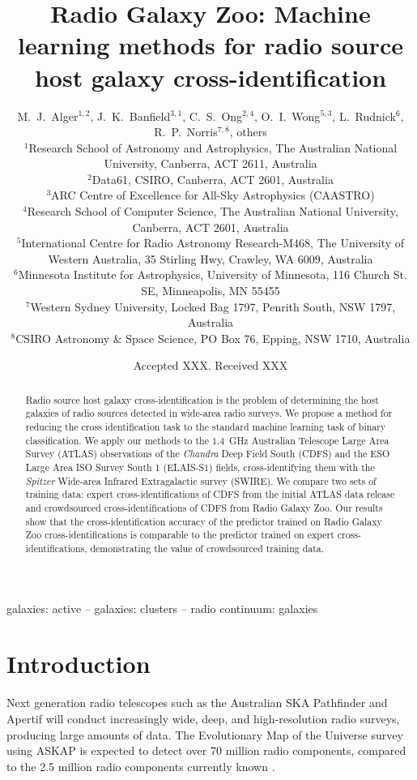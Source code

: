 \documentclass[fleqn,usenatbib,usedcolumn]{mnras}
\title[Machine learning methods for radio source cross-identification]{Radio Galaxy Zoo: Machine learning methods for radio source host galaxy cross-identification}
\author[Alger et al.]{
  M.~J.~Alger$^{1, 2}$,
  J.~K.~Banfield$^{3, 1}$,
  C.~S.~Ong$^{2, 4}$,
  O.~I.~Wong$^{5, 3}$,
  L.~Rudnick$^{6}$,
  R.~P.~Norris$^{7, 8}$,
  others
\\
$^{1}$Research School of Astronomy and Astrophysics, The Australian National University, Canberra, ACT 2611, Australia\\
$^{2}$Data61, CSIRO, Canberra, ACT 2601, Australia\\
$^{3}$ARC Centre of Excellence for All-Sky Astrophysics (CAASTRO)\\
$^{4}$Research School of Computer Science, The Australian National University, Canberra, ACT 2601, Australia\\
$^{5}$International Centre for Radio Astronomy Research-M468, The University of Western Australia, 35 Stirling Hwy, Crawley, WA 6009, Australia\\
$^{6}$Minnesota Institute for Astrophysics, University of Minnesota, 116 Church St. SE, Minneapolis, MN 55455\\
$^{7}$Western Sydney University, Locked Bag 1797, Penrith South, NSW 1797, Australia\\
$^{8}$CSIRO Astronomy \& Space Science, PO Box 76, Epping, NSW 1710, Australia
}
\date{Accepted XXX. Received XXX}
\begin{document}
\label{firstpage}
\pagerange{\pageref{firstpage}--\pageref{lastpage}}
\maketitle

\begin{abstract}
  Radio source host galaxy cross-identification is the problem of determining
  the host galaxies of radio sources detected in wide-area radio surveys. We
  propose a method for reducing the cross identification task to the standard
  machine learning task of binary classification. We apply our methods to the
  $1.4$~GHz Australian Telescope Large Area Survey (ATLAS) observations of the
  \emph{Chandra} Deep Field South (CDFS) and the ESO Large Area ISO Survey
  South 1 (ELAIS-S1) fields, cross-identifying them with the \emph{Spitzer}
  Wide-area Infrared Extragalactic survey (SWIRE). We compare two sets of
  training data: expert cross-identifications of CDFS from the initial ATLAS
  data release and crowdsourced cross-identifications of CDFS from Radio
  Galaxy Zoo. Our results show that the cross-identification accuracy of the
  predictor trained on Radio Galaxy Zoo cross-identifications is comparable to
  the predictor trained on expert cross-identifications, demonstrating the
  value of crowdsourced training data.
\end{abstract}

\begin{keywords}
galaxies: active -- galaxies: clusters -- radio continuum: galaxies
\end{keywords}


\section{Introduction}\label{introduction}

  Next generation radio telescopes such as the Australian SKA Pathfinder
  \citep[ASKAP;][]{johnston07} and Apertif \citep{verheijen08} will conduct
  increasingly wide, deep, and high-resolution radio surveys, producing large
  amounts of data. The Evolutionary Map of the Universe survey
  \citep[EMU;][]{norris11} using ASKAP is expected to detect over 70 million
  radio components, compared to the 2.5 million radio components currently
  known \citep{banfield15}.
\end{document}

